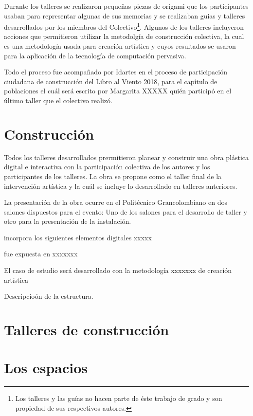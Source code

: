 Durante los talleres se realizaron pequeñas piezas de origami que los participantes usaban para representar algunas de sus memorias y se realizaban guias y talleres desarrollados por los miembros del Colectivo\footnote{Los talleres y las guías no hacen parte de éste trabajo de grado y son propiedad de sus respectivos autores.}. Algunos de los talleres incluyeron acciones que permitieron utilizar la metodolgía de construcción colectiva, la cual es una metodología usada para creación artística y cuyos resultados se usaron para la aplicación de la tecnología de computación pervasiva.

Todo el proceso fue acompañado por Idartes en el proceso de participación ciudadana de construcción del Libro al Viento 2018, para el capítulo de poblaciones el cuál será escrito por Margarita XXXXX quién participó en el último taller que el colectivo realizó.

\section{Construcción}

Todos los talleres desarrollados prermitieron planear y construir una obra plástica digital e interactiva con la participación colectiva de los autores y los participantes de los talleres. La obra se propone como el taller final de la intervención artística y la cuál se incluye lo desarrollado en talleres anteriores.

La presentación de la obra ocurre en el Politécnico Grancolombiano en dos salones dispuestos para el evento: Uno de los salones para el desarrollo de taller y otro para la presentación de la instalación.



incorpora los siguientes elementos digitales xxxxx

fue expuesta en xxxxxxx

El caso de estudio será desarrollado con la metodología xxxxxxx de creación artística

Descripcioón de la estructura.


\section{Talleres de construcción}


\section{Los espacios}

